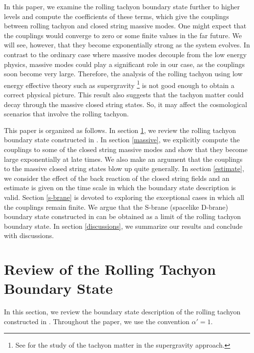\documentclass[a4paper,12pt]{article} \textheight=8.5truein
\begin{document}
In this paper, we examine the rolling tachyon boundary state
further to higher levels and compute the coefficients of these
terms, which give the couplings between rolling tachyon and closed
string massive modes. One might expect that the couplings would
converge to zero or some finite values in the far future. We will
see, however, that they become exponentially strong as the system
evolves. In contrast to the ordinary case where massive modes
decouple from the low energy physics, massive modes could play a
significant role in our case, as the couplings soon become very
large. Therefore, the analysis of the rolling tachyon using low
energy effective theory such as supergravity \footnote{See
\cite{Ohta:2002ac,Buchel:2002tj} for the study of the tachyon
matter in the supergravity approach.} is not good enough to obtain
a correct physical picture. This result also suggests that the
tachyon matter could decay through the massive closed string
states. So, it may affect the cosmological scenarios that involve
the rolling tachyon.


This paper is organized as follows.
In section \ref{review}, we review the rolling tachyon
 boundary state constructed in \cite{Sen:2002nu,Sen:2002in}.
In section \ref{massive}, we explicitly compute the couplings to
some of the closed string massive modes and show that they become
large exponentially at late times. We also make an argument that
the couplings to the massive closed string states blow up quite
generally. In section \ref{estimate}, we consider the effect of
the back reaction of the closed string fields and an estimate is
given on the time scale in which the boundary state description is
valid. Section \ref{s-brane} is devoted to exploring the
exceptional cases in which all the couplings remain finite. We
argue that the S-brane (spacelike D-brane) boundary state
constructed in \cite{Gutperle:2002ai} can be obtained as a limit
of the rolling tachyon boundary state. In section
\ref{discussions}, we summarize our results and conclude with
discussions.

\section{Review of the Rolling Tachyon Boundary State} \label{review}

In this section, we review the boundary state description of the
rolling tachyon constructed in \cite{Sen:2002nu,Sen:2002in}.
Throughout the paper, we use the convention $\alpha'=1$.
\end{document}
